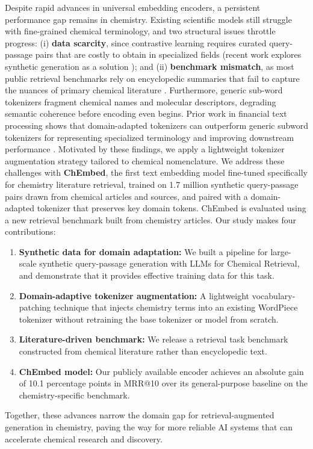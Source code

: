 \documentclass[twoside,twocolumn,9pt]{article}
\begin{document}
Despite rapid advances in universal embedding encoders, a persistent performance gap remains in chemistry. Existing scientific models still struggle with fine-grained chemical terminology, and two structural issues throttle progress: (i) \textbf{data scarcity}, since contrastive learning requires curated query-passage pairs that are costly to obtain in specialized fields (recent work explores synthetic generation as a solution \cite{adler2024nemotron,bonifacio2022inpars,jeronymo2023inpars}); and (ii) \textbf{benchmark mismatch}, as most public retrieval benchmarks rely on encyclopedic summaries that fail to capture the nuances of primary chemical literature \cite{pmlr-v262-shiraee-kasmaee24a}. Furthermore, generic sub-word tokenizers fragment chemical names and molecular descriptors, degrading semantic coherence before encoding even begins. Prior work in financial text processing shows that domain-adapted tokenizers can outperform generic subword tokenizers for representing specialized terminology and improving downstream performance \cite{bommarito2025kl3m}. Motivated by these findings, we apply a lightweight tokenizer augmentation strategy tailored to chemical nomenclature.
We address these challenges with \textbf{ChEmbed}, the first text embedding model fine-tuned specifically for chemistry literature retrieval, trained on 1.7 million synthetic query-passage pairs drawn from chemical articles and sources, and paired with a domain-adapted tokenizer that preserves key domain tokens. ChEmbed is evaluated using a new retrieval benchmark built from chemistry articles. Our study makes four contributions:
\begin{enumerate}
\item \textbf{Synthetic data for domain adaptation:} We built a pipeline for large-scale synthetic query-passage generation with LLMs for Chemical Retrieval, and demonstrate that it provides effective training data for this task.
\item \textbf{Domain-adaptive tokenizer augmentation:} A lightweight vocabulary-patching technique that injects chemistry terms into an existing WordPiece tokenizer without retraining the base tokenizer or model from scratch.
\item \textbf{Literature-driven benchmark:} We release a retrieval task benchmark constructed from chemical literature rather than encyclopedic text.
\item \textbf{ChEmbed model:} Our publicly available encoder achieves an absolute gain of 10.1 percentage points in MRR@10 over its general-purpose baseline on the chemistry-specific benchmark.
\end{enumerate}
Together, these advances narrow the domain gap for retrieval-augmented generation in chemistry, paving the way for more reliable AI systems that can accelerate chemical research and discovery.
\end{document}
